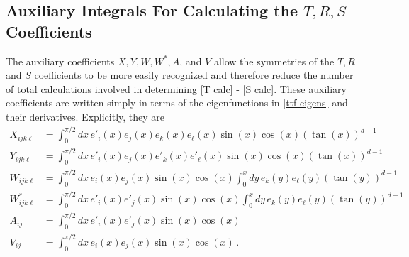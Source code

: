 \documentclass[../PhD.tex]{subfiles}
\begin{document}
\begin{subappendices}

\section{Auxiliary Integrals For Calculating the $T, R, S$ Coefficients}
\label{app: integrals}

The auxiliary coefficients $X, Y, W, W^*, A$, and $V$ allow the symmetries of the $T, R$ and $S$ coefficients to be more easily recognized and therefore reduce the number of total calculations involved in determining \eqref{T calc} - \eqref{S calc}. These auxiliary coefficients are written simply in terms of the eigenfunctions in \eqref{ttf eigens} and their derivatives. Explicitly, they are
\begin{align}
\label{X int}
X_{ijk\ell} &= \int^{\pi/2}_0 dx \, e'_i(x) e_j(x) e_k(x) e_\ell(x) \sin(x) \cos(x) \left( \tan(x) \right)^{d-1} \\
\label{Y int}
Y_{ijk\ell} &= \int^{\pi/2}_0 dx \, e'_i(x) e_j(x) e'_k(x) e'_\ell(x) \sin(x) \cos(x) \left( \tan(x) \right)^{d-1} \\
\label{W int}
W_{ijk\ell} &= \int^{\pi/2}_0 dx \, e_i(x) e_j(x) \sin(x) \cos(x) \int^x_0 dy \, e_k(y) e_\ell(y) \left( \tan(y) \right)^{d-1} \\
\label{W* int}
W^*_{ijk\ell} &= \int^{\pi/2}_0 dx \, e'_i(x) e'_j(x) \sin(x) \cos(x) \int^x_0 dy \, e_k(y) e_\ell(y) \left( \tan(y) \right)^{d-1} \\
\label{A int}
A_{ij} &= \int^{\pi/2}_0 dx \, e'_i(x) e'_j(x) \sin(x) \cos(x) \\
\label{V int}
V_{ij} &= \int^{\pi/2}_0 dx \, e_i(x) e_j(x) \sin(x) \cos(x) \, .
\end{align}


\end{subappendices}
\end{document}
